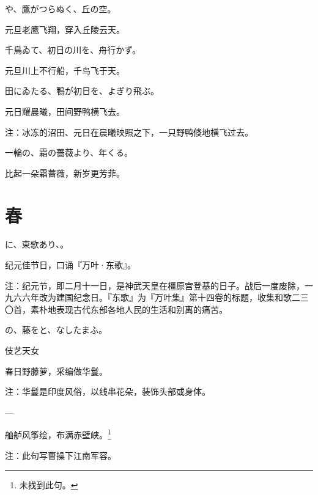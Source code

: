 \begin{haiku}
    {\FH {}や、鷹がつらぬく、丘の空。}

    {\FK 元旦老鹰飞翔，穿入丘陵云天。}
\end{haiku}

\begin{haiku}
    {\FH 千鳥ゐて、初日の川を、舟行かず。}

    {\FK 元旦川上不行船，千鸟飞于天。}
\end{haiku}

\begin{haiku}
    {\FH 田にゐたる、鴨が初日を、よぎり飛ぶ。}

    {\FK 元日耀晨曦，田间野鸭横飞去。}

    {\FT 注：冰冻的沼田、元日在晨曦映照之下，一只野鸭倏地横飞过去。}
\end{haiku}

\begin{haiku}
    {\FH 一輪の、霜の薔薇より、年くる。}

    {\FK 比起一朵霜蔷薇，新岁更芳菲。}
\end{haiku}

\section{\FK 春}

\setcounter{haikucounter}{0}

\begin{haiku}
    {\FH {}に、東歌あり、。}

    {\FK 纪元佳节日，口诵『万叶·东歌』。}

    {\FT 注：纪元节，即二月十一日，是神武天皇在橿原宫登基的日子。战后一度废除，一九六六年改为建国纪念日。『东歌』为『万叶集』第十四卷的标题，收集和歌二三〇首，素朴地表现古代东部各地人民的生活和别离的痛苦。}
\end{haiku}

\begin{haiku}
    {\FH {}の、藤をと、なしたまふ。}

    {\FK 伎艺天女}

    {\FK 春日野藤萝，采编做华鬘。}

    {\FT 注：华鬘是印度风俗，以线串花朵，装饰头部或身体。}
\end{haiku}

\begin{haiku}
    {\FH ---}

    {\FK 舳舻风筝绘，布满赤壁峡。\footnote{\FT 未找到此句。}}

    {\FT 注：此句写曹操下江南军容。}
\end{haiku}

